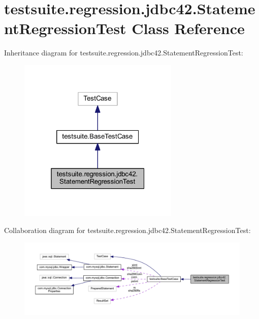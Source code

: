 \hypertarget{classtestsuite_1_1regression_1_1jdbc42_1_1_statement_regression_test}{}\section{testsuite.\+regression.\+jdbc42.\+Statement\+Regression\+Test Class Reference}
\label{classtestsuite_1_1regression_1_1jdbc42_1_1_statement_regression_test}


Inheritance diagram for testsuite.\+regression.\+jdbc42.\+Statement\+Regression\+Test\+:
\nopagebreak
\begin{figure}[H]
\begin{center}
\leavevmode
\includegraphics[width=217pt]{classtestsuite_1_1regression_1_1jdbc42_1_1_statement_regression_test__inherit__graph}
\end{center}
\end{figure}


Collaboration diagram for testsuite.\+regression.\+jdbc42.\+Statement\+Regression\+Test\+:
\nopagebreak
\begin{figure}[H]
\begin{center}
\leavevmode
\includegraphics[width=350pt]{classtestsuite_1_1regression_1_1jdbc42_1_1_statement_regression_test__coll__graph}
\end{center}
\end{figure}
